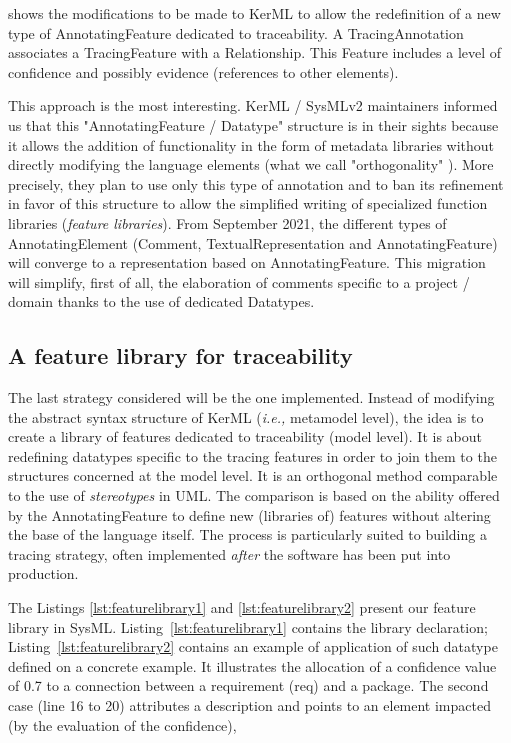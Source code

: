 shows the modifications to be made to {KerML} to allow the redefinition of a new type of AnnotatingFeature dedicated to traceability.
A TracingAnnotation associates a TracingFeature with a Relationship. This Feature includes a level of confidence and possibly evidence (references to other elements).



This approach is the most interesting. KerML / SysMLv2 maintainers informed us that this "AnnotatingFeature / Datatype" structure is in their sights because it allows the addition of functionality in the form of metadata libraries without directly modifying the language elements (what we call "orthogonality" ). More precisely, they plan to use only this type of annotation and to ban its refinement in favor of this structure to allow the simplified writing of specialized function libraries (\textit{feature libraries}).
From September 2021, the different types of AnnotatingElement (Comment, TextualRepresentation and AnnotatingFeature) will converge to a representation based on AnnotatingFeature. This migration will simplify, first of all, the elaboration of comments specific to a project / domain thanks to the use of dedicated Datatypes.

\subsection{A feature library for traceability }
The last strategy considered will be the one implemented. Instead of modifying the abstract syntax structure of {KerML} (\textit{i.e.,} metamodel level), the idea is to create a library of features dedicated to traceability (model level).
It is about redefining datatypes specific to the tracing features in order to join them to the structures concerned at the model level. It is an orthogonal method comparable to the use of \textit{stereotypes} in UML. The comparison is based on the ability offered by the AnnotatingFeature to define new (libraries of) features without altering the base of the language itself. The process is particularly suited to building a tracing strategy, often implemented \textit{after} the software has been put into production.

\vspace{3em}
The Listings \ref{lst:featurelibrary1} and \ref{lst:featurelibrary2} present our feature library {in SysML}. Listing~\ref{lst:featurelibrary1} contains the library declaration; Listing~\ref{lst:featurelibrary2} contains an example of application of such datatype  defined on a concrete example. It illustrates the allocation of a confidence value of 0.7 to a connection between a requirement (req) and a package. The second case (line 16 to 20) attributes a description and points to an element impacted (by the evaluation of the confidence),


% 


